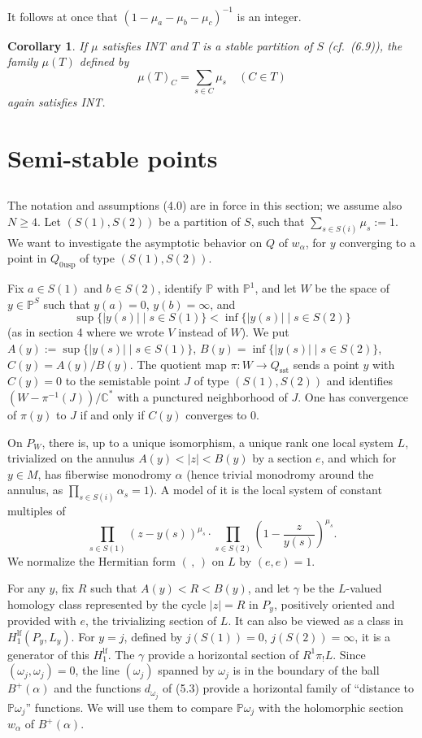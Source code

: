 \documentclass[12pt,a4paper]{article}
\theoremstyle{plain}
\newtheorem{corollary}[theorem]{Corollary}
\theoremstyle{definition}
\theoremstyle{remark}
\newcommand{\CC}{\mathbb{C}}
\newcommand{\PP}{\mathbb{P}}
\numberwithin{equation}{section}
\providecommand{\CC}{\mathbb{C}}
\providecommand{\PP}{\mathbb{P}}
\begin{document}
It follows at once that $(1 - \mu_a - \mu_b - \mu_c)^{-1}$ is an integer.

\begin{corollary}\label{cor:6.11}
If $\mu$ satisfies INT and $T$ is a stable partition of $S$ (cf.\ (6.9)), the family $\mu(T)$ defined by
\[
\mu(T)_C = \sum_{s \in C} \mu_s \quad (C \in T)
\]
again satisfies INT.
\end{corollary}


\section{Semi-stable points}

\subsection{}
The notation and assumptions (4.0) are in force in this section; we assume also $N \geq 4$. Let $(S(1), S(2))$ be a partition of $S$, such that $\sum_{s \in S(i)} \mu_s := 1$. We want to investigate the asymptotic behavior on $Q$ of $w_\alpha$, for $y$ converging to a point in $Q_{0\mathrm{usp}}$ of type $(S(1), S(2))$.

Fix $a \in S(1)$ and $b \in S(2)$, identify $\PP$ with $\PP^1$, and let $W$ be the space of $y \in \PP^S$ such that $y(a) = 0$, $y(b) = \infty$, and
\[
\sup \{|y(s)| \mid s \in S(1)\} < \inf \{|y(s)| \mid s \in S(2)\}
\]
(as in section 4 where we wrote $V$ instead of $W$). We put $A(y) := \sup \{|y(s)| \mid s \in S(1)\}$, $B(y) = \inf\{|y(s)| \mid s \in S(2)\}$, $C(y) = A(y)/B(y)$. The quotient map $\pi: W \to Q_{\mathrm{sst}}$ sends a point $y$ with $C(y) = 0$ to the semistable point $J$ of type $(S(1), S(2))$ and identifies $(W - \pi^{-1}(J))/\CC^*$ with a punctured neighborhood of $J$. One has convergence of $\pi(y)$ to $J$ if and only if $C(y)$ converges to $0$.

On $P_W$, there is, up to a unique isomorphism, a unique rank one local system $L$, trivialized on the annulus $A(y) < |z| < B(y)$ by a section $e$, and which for $y \in M$, has fiberwise monodromy $\alpha$ (hence trivial monodromy around the annulus, as $\prod_{s \in S(i)} \alpha_s = 1$). A model of it is the local system of constant multiples of
\[
\prod_{s \in S(1)} (z - y(s))^{\mu_s} \cdot \prod_{s \in S(2)} \left(1 - \frac{z}{y(s)}\right)^{\mu_s}.
\]
We normalize the Hermitian form $(\,,\,)$ on $L$ by $(e, e) = 1$.

For any $y$, fix $R$ such that $A(y) < R < B(y)$, and let $\gamma$ be the $L$-valued homology class represented by the cycle $|z| = R$ in $P_y$, positively oriented and provided with $e$, the trivializing section of $L$. It can also be viewed as a class in $H^{\mathrm{lf}}_1(P_y, L_y)$. For $y = j$, defined by $j(S(1)) = 0$, $j(S(2)) = \infty$, it is a generator of this $H^{\mathrm{lf}}_1$. The $\gamma$ provide a horizontal section of $R^1\pi_! L$. Since $(\omega_j, \omega_j) = 0$, the line $(\omega_j)$ spanned by $\omega_j$ is in the boundary of the ball $B^+(\alpha)$ and the functions $d_{\omega_j}$ of (5.3) provide a horizontal family of ``distance to $\PP \omega_j$'' functions. We will use them to compare $\PP \omega_j$ with the holomorphic section $w_\alpha$ of $B^+(\alpha)$.
\end{document}
